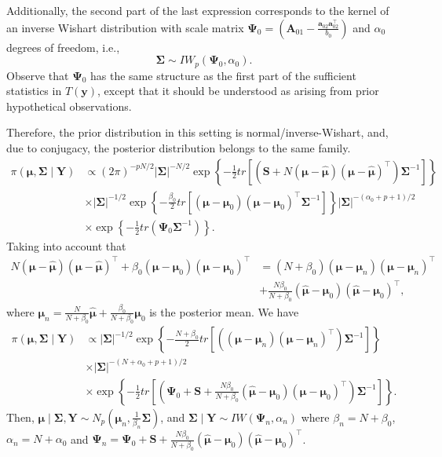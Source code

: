 \begin{enumerate}
Additionally, the second part of the last expression corresponds to the kernel of an inverse Wishart distribution with scale matrix \( \bm{\Psi}_0 = \left( \bm{A}_{01} - \frac{\bm{a}_{02} \bm{a}_{02}^{\top}}{b_0} \right) \) and \( \alpha_0 \) degrees of freedom, i.e.,
\[
\bm{\Sigma} \sim IW_p (\bm{\Psi}_0, \alpha_0).
\]
Observe that \( \bm{\Psi}_0 \) has the same structure as the first part of the sufficient statistics in \( T(\bm{y}) \), except that it should be understood as arising from prior hypothetical observations.

Therefore, the prior distribution in this setting is normal/inverse-Wishart, and, due to conjugacy, the posterior distribution belongs to the same family.
{\footnotesize{
\begin{align}
	\pi(\bm{\mu},\bm{\Sigma}\mid \bm{Y})&\propto
	(2\pi)^{-p N/2}|\bm{\Sigma}|^{-N/2}\exp\left\{-\frac{1}{2}tr\left[\left(\bm{S}+N\left(\bm{\mu}-\hat{\bm{\mu}}\right)\left(\bm{\mu}-\hat{\bm{\mu}}\right)^{\top}\right)\bm{\Sigma}^{-1}\right]\right\}\nonumber\\
	&\times |\bm{\Sigma}|^{-1/2}\exp\left\{-\frac{\beta_0}{2}tr\left[(\bm{\mu}-\bm{\mu}_0)(\bm{\mu}-\bm{\mu}_0)^{\top}\bm{\Sigma}^{-1}\right]\right\}|\bm{\Sigma}|^{-(\alpha_0+p+1)/2}\nonumber\\
	&\times\exp\left\{-\frac{1}{2}tr(\bm{\Psi}_0\bm{\Sigma}^{-1})\right\}\nonumber.
\end{align}
}}
Taking into account that
{\footnotesize{ 
\begin{align}
	N\left(\bm{\mu}-\hat{\bm{\mu}}\right)\left(\bm{\mu}-\hat{\bm{\mu}}\right)^{\top}+\beta_0\left(\bm{\mu}-\bm{\mu}_0\right)\left(\bm{\mu}-\bm{\mu}_0\right)^{\top}&=(N+\beta_0)\left(\bm{\mu}-\bm{\mu}_n\right)\left(\bm{\mu}-\bm{\mu}_n\right)^{\top}\nonumber\\
	&+\frac{N\beta_0}{N+\beta_0}\left(\hat{\bm{\mu}}-\bm{\mu}_0\right)\left(\hat{\bm{\mu}}-\bm{\mu}_0\right)^{\top},\nonumber
\end{align}
}}
where $\bm{\mu}_n=\frac{N}{N+\beta_0}\hat{\bm{\mu}}+\frac{\beta_0}{N+\beta_0}\bm{\mu}_0$ is the posterior mean. We have
{\footnotesize{ 
\begin{align}
	\pi(\bm{\mu},\bm{\Sigma}\mid \bm{Y})&\propto |\bm\Sigma|^{-1/2}\exp\left\{-\frac{N+\beta_0}{2}tr\left[\left(\left(\bm{\mu}-\bm{\mu}_n\right)\left(\bm{\mu}-\bm{\mu}_n\right)^{\top}\right)\bm{\Sigma}^{-1}\right]\right\}\nonumber\\
	&\times |\bm{\Sigma}|^{-(N+\alpha_0+p+1)/2}\nonumber\\
	&\times\exp\left\{-\frac{1}{2}tr\left[\left(\bm{\Psi}_0+\bm{S}+\frac{N\beta_0}{N+\beta_0}(\hat{\bm{\mu}}-\bm{\mu}_0)(\hat{\bm{\mu}}-\bm{\mu}_0)^{\top}\right)\bm{\Sigma}^{-1}\right]\right\}.\nonumber
\end{align}
}}
Then, $\bm{\mu}\mid \bm{\Sigma},\bm{Y}\sim N_p\left(\bm{\mu}_n,\frac{1}{\beta_n}\bm{\Sigma}\right)$, and $\bm{\Sigma}\mid \bm{Y}\sim IW\left(\bm{\Psi}_n,\alpha_n\right)$ where $\beta_n=N+\beta_0$, $\alpha_n=N+\alpha_0$ and $\bm{\Psi}_n=\bm{\Psi}_0+\bm{S}+\frac{N\beta_0}{N+\beta_0}(\hat{\bm{\mu}}-\bm{\mu}_0)(\hat{\bm{\mu}}-\bm{\mu}_0)^{\top}$.


\end{enumerate}
